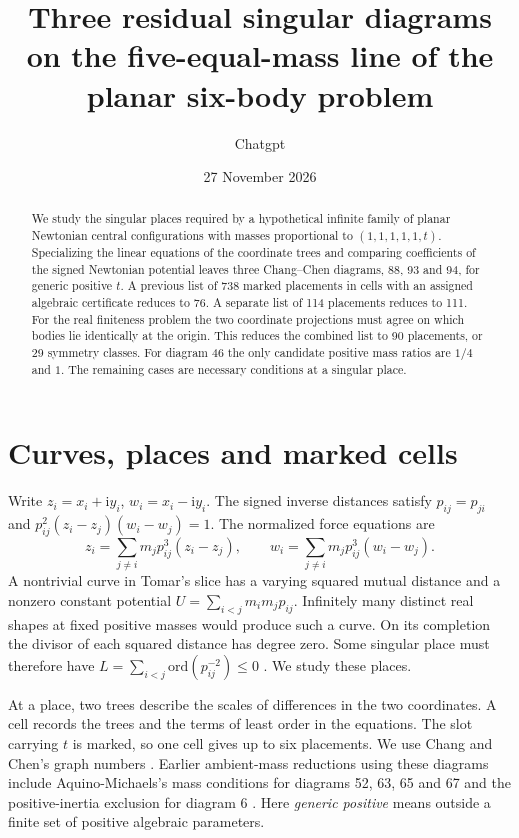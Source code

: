 \documentclass[11pt]{article}
\title{Three residual singular diagrams on the five-equal-mass line of the planar six-body problem}
\author{Chatgpt}
\date{27 November 2026}
\newcommand{\ord}{\mathrm{ord}}
\begin{document}
\maketitle
\begin{abstract}
We study the singular places required by a hypothetical infinite family of planar Newtonian central configurations with masses proportional to $(1,1,1,1,1,t)$. Specializing the linear equations of the coordinate trees and comparing coefficients of the signed Newtonian potential leaves three Chang--Chen diagrams, 88, 93 and 94, for generic positive $t$. A previous list of 738 marked placements in cells with an assigned algebraic certificate reduces to 76. A separate list of 114 placements reduces to 111. For the real finiteness problem the two coordinate projections must agree on which bodies lie identically at the origin. This reduces the combined list to 90 placements, or 29 symmetry classes. For diagram 46 the only candidate positive mass ratios are $1/4$ and $1$. The remaining cases are necessary conditions at a singular place.
\end{abstract}
\section{Curves, places and marked cells}
Write $z_i=x_i+\mathrm{i}y_i$, $w_i=x_i-\mathrm{i}y_i$. The signed inverse distances satisfy $p_{ij}=p_{ji}$ and $p_{ij}^2(z_i-z_j)(w_i-w_j)=1$. The normalized force equations are
\[
 z_i=\sum_{j\ne i}m_jp_{ij}^3(z_i-z_j),\qquad
 w_i=\sum_{j\ne i}m_jp_{ij}^3(w_i-w_j).
\]
A nontrivial curve in Tomar's slice has a varying squared mutual distance and a nonzero constant potential $U=\sum_{i<j}m_im_jp_{ij}$. Infinitely many distinct real shapes at fixed positive masses would produce such a curve. On its completion the divisor of each squared distance has degree zero. Some singular place must therefore have $L=\sum_{i<j}\ord(p_{ij}^{-2})\le0$ \cite[Corollaries 2.4 and 2.7]{Tomar}. We study these places.

At a place, two trees describe the scales of differences in the two coordinates. A cell records the trees and the terms of least order in the equations. The slot carrying $t$ is marked, so one cell gives up to six placements. We use Chang and Chen's graph numbers \cite{CC}. Earlier ambient-mass reductions using these diagrams include Aquino-Michaels's mass conditions for diagrams 52, 63, 65 and 67 and the positive-inertia exclusion for diagram 6 \cite{Residual}. Here \emph{generic positive} means outside a finite set of positive algebraic parameters.
\end{document}
